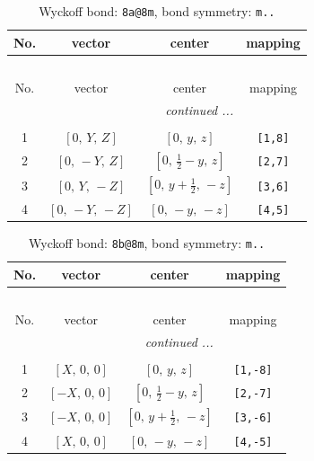 \documentclass[fleqn,8pt]{jsarticle}
\begin{document}
\begin{longtable}{cccc}
\caption{Wyckoff bond: {\tt 8a@8m}, bond symmetry: {\tt m..}}
 \\
 \hline \hline
No. & vector & center & mapping \\ \hline \endfirsthead

\multicolumn{3}{l}{\tablename\ \thetable{}} \\
 \hline \hline
No. & vector & center & mapping \\ \hline \endhead

 \hline \hline
\multicolumn{3}{r}{\footnotesize\it continued ...} \\ \endfoot

 \hline \hline
\multicolumn{3}{r}{} \\ \endlastfoot

1 & $\left[ 0,\, Y,\, Z \right]$ & $\left[ 0,\, y,\, z \right]$ & {\tt [1,8]} \\ \hline
2 & $\left[ 0,\, - Y,\, Z \right]$ & $\left[ 0,\, \frac{1}{2} - y,\, z \right]$ & {\tt [2,7]} \\ \hline
3 & $\left[ 0,\, Y,\, - Z \right]$ & $\left[ 0,\, y + \frac{1}{2},\, - z \right]$ & {\tt [3,6]} \\ \hline
4 & $\left[ 0,\, - Y,\, - Z \right]$ & $\left[ 0,\, - y,\, - z \right]$ & {\tt [4,5]} \\
\end{longtable}
\renewcommand{\arraystretch}{1.2}
\begin{longtable}{cccc}
\caption{Wyckoff bond: {\tt 8b@8m}, bond symmetry: {\tt m..}}
 \\
 \hline \hline
No. & vector & center & mapping \\ \hline \endfirsthead

\multicolumn{3}{l}{\tablename\ \thetable{}} \\
 \hline \hline
No. & vector & center & mapping \\ \hline \endhead

 \hline \hline
\multicolumn{3}{r}{\footnotesize\it continued ...} \\ \endfoot

 \hline \hline
\multicolumn{3}{r}{} \\ \endlastfoot

1 & $\left[ X,\, 0,\, 0 \right]$ & $\left[ 0,\, y,\, z \right]$ & {\tt [1,-8]} \\ \hline
2 & $\left[ - X,\, 0,\, 0 \right]$ & $\left[ 0,\, \frac{1}{2} - y,\, z \right]$ & {\tt [2,-7]} \\ \hline
3 & $\left[ - X,\, 0,\, 0 \right]$ & $\left[ 0,\, y + \frac{1}{2},\, - z \right]$ & {\tt [3,-6]} \\ \hline
4 & $\left[ X,\, 0,\, 0 \right]$ & $\left[ 0,\, - y,\, - z \right]$ & {\tt [4,-5]} \\
\end{longtable}
\end{document}
